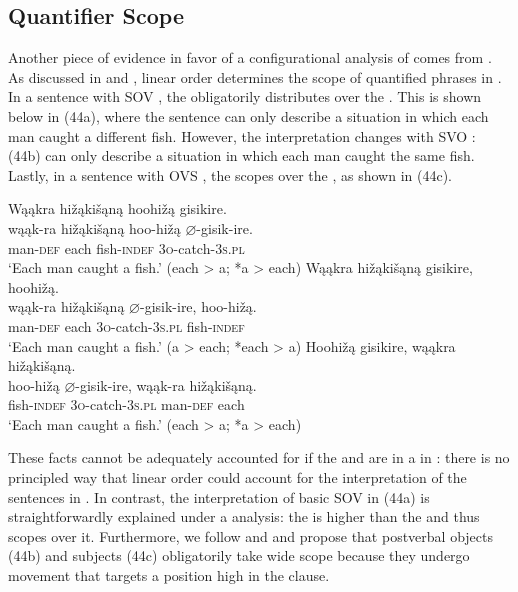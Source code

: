\documentclass[output=paper]{LSP/langsci}
\begin{document}
\subsection{Quantifier Scope}

Another piece of evidence in favor of a configurational analysis of  comes from . As discussed in \citealt{Johnson2014} and   \citealt{JohnsonRosen2014}, linear order determines the scope of quantified phrases in . In a sentence with SOV , the  obligatorily distributes over the . This is shown below in (44a), where the sentence can only describe a situation in which each man caught a different fish. However, the interpretation changes with SVO : (44b) can only describe a situation in which each man caught the same fish. Lastly, in a sentence with OVS , the  scopes over the , as shown in (44c).

\begin{exe}
\ex\label{ex:jrs:44}
\begin{xlist}
\ex 
\glll Wąąkra	hi\v{z}ąki\v{s}ąną		hoohi\v{z}ą	gisikire.\\
wąąk-ra		hi\v{z}ąki\v{s}ąną		hoo-hi\v{z}ą	$\varnothing$-gisik-ire. \\
		man-\textsc{def}		each					fish-\textsc{indef}		\textsc{3o}-catch-\textsc{3s.pl} \\
\trans `Each man caught a fish.' (each > a; *a > each)
\ex 
\glll Wąąkra		hi\v{z}ąki\v{s}ąną		gisikire,			hoohi\v{z}ą.\\
wąąk-ra		hi\v{z}ąki\v{s}ąną		$\varnothing$-gisik-ire,	hoo-hi\v{z}ą. \\
		man-\textsc{def}		each					\textsc{3o}-catch-\textsc{3s.pl}		fish-\textsc{indef} \\
\trans `Each man caught a fish.'  (a > each; *each > a)
\ex 
\glll Hoohi\v{z}ą	gisikire,	wąąkra	 hi\v{z}ąki\v{s}ąną.\\
hoo-hi\v{z}ą	$\varnothing$-gisik-ire,		wąąk-ra	hi\v{z}ąki\v{s}ąną. \\
		fish-\textsc{indef}		\textsc{3o}-catch-\textsc{3s.pl}		man-\textsc{def}		each \\
\trans `Each man caught a fish.' (each > a; *a > each)
\end{xlist}
\end{exe}

These facts cannot be adequately accounted for if the  and  are in a  in : there is no principled way that linear order could account for the interpretation of the sentences in . In contrast, the interpretation of basic SOV  in (44a) is straightforwardly explained under a  analysis: the  is higher than the  and thus scopes over it. Furthermore, we follow \citet{Johnson2014} and  \citet{JohnsonRosen2014} and propose that postverbal objects (44b) and subjects (44c) obligatorily take wide scope because they undergo movement that targets a position high in the clause. 
\end{document}
